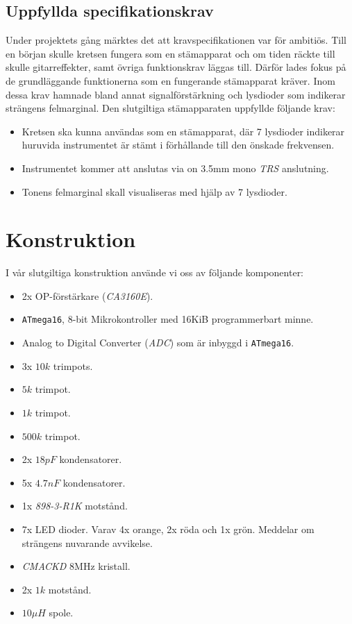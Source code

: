 \documentclass[a4paper]{article}
\begin{document}
\subsection{Uppfyllda specifikationskrav}
Under projektets gång märktes det att kravspecifikationen var för ambitiös. Till en början skulle kretsen fungera som en stämapparat och om tiden räckte till skulle gitarreffekter, samt övriga funktionskrav läggas till. Därför lades fokus på de grundläggande funktionerna som en fungerande stämapparat kräver. Inom dessa krav hamnade bland annat signalförstärkning och lysdioder som indikerar strängens felmarginal. Den slutgiltiga stämapparaten uppfyllde följande krav:

\begin{itemize}
\item Kretsen ska kunna användas som en stämapparat, där 7 lysdioder indikerar huruvida instrumentet är stämt i förhållande till den önskade frekvensen.
\item Instrumentet kommer att anslutas via on 3.5mm mono \textit{TRS} anslutning.
\item Tonens felmarginal skall visualiseras med hjälp av 7 lysdioder.
\end{itemize}


\section{Konstruktion}
I vår slutgiltiga konstruktion använde vi oss av följande komponenter:
\begin{itemize}
\item 2x OP-förstärkare (\textit{CA3160E}).\cite{op}
\item \texttt{ATmega16}, 8-bit Mikrokontroller med 16KiB programmerbart minne.\cite{atmega16}
\item Analog to Digital Converter (\textit{ADC}) som är inbyggd i \texttt{ATmega16}.
\item 3x $10k$ trimpots.
\item $5k$ trimpot.
\item $1k$ trimpot.
\item $500k$ trimpot.
\item 2x $18pF$ kondensatorer.
\item 5x $4.7nF$ kondensatorer.
\item 1x \textit{898-3-R1K} motstånd.
\item 7x LED dioder. Varav 4x orange, 2x röda och 1x grön. Meddelar om strängens nuvarande avvikelse.
\item \textit{CMACKD} 8MHz kristall.
\item 2x $1k$ motstånd.
\item $10 \mu H$ spole.
\end{itemize}
\end{document}
